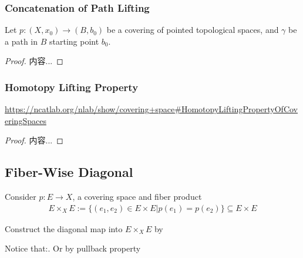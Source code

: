\documentclass[Total.tex]{subfiles}
\begin{document}
			\subsubsection{Concatenation of Path Lifting}
			\begin{proposition}
				Let $p:(X,x_0)\rightarrow (B,b_0)$ be a covering of pointed topological spaces, and $\gamma$ be a path in $B$ starting point $b_0$. 
			\end{proposition}
			\begin{proof}
				内容...
			\end{proof}
			\subsubsection{Homotopy Lifting Property}
			\begin{theorem}
				
				
				\url{https://ncatlab.org/nlab/show/covering+space#HomotopyLiftingPropertyOfCoveringSpaces}
			\end{theorem}
			\begin{proof}
				内容...
			\end{proof}
			\subsection{Fiber-Wise Diagonal}
			\begin{Def}
				Consider $p:E\rightarrow X$, a covering space and fiber product
				\begin{gather*}
					E\times_X E:=\{(e_1,e_2)\in E\times E|p(e_1)=p(e_2)\}\subseteq E\times E
				\end{gather*}
			\end{Def}
			
			Construct the diagonal map into $E\times_X E$ by
			\begin{center}
			\end{center}
			
			Notice that:. Or by pullback property
			\begin{center}
			\end{center}
			
\end{document}
